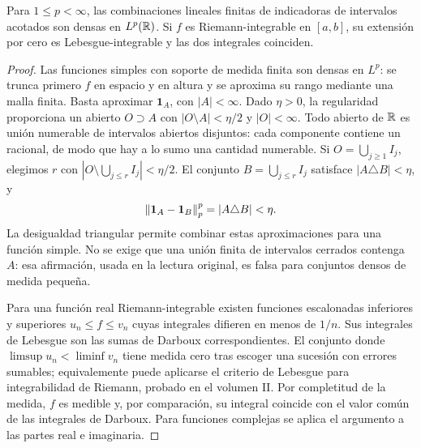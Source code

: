 \begin{teorema}\label{v4:densidad-escalonadas}
Para $1\leq p<\infty$, las combinaciones lineales finitas de indicadoras de intervalos acotados son densas en $L^p(\mathbb R)$. Si $f$ es Riemann-integrable en $[a,b]$, su extensión por cero es Lebesgue-integrable y las dos integrales coinciden.
\end{teorema}
\begin{proof}
Las funciones simples con soporte de medida finita son densas en $L^p$: se trunca primero $f$ en espacio y en altura y se aproxima su rango mediante una malla finita. Basta aproximar $\mathbf1_A$, con $|A|<\infty$. Dado $\eta>0$, la regularidad proporciona un abierto $O\supset A$ con $|O\setminus A|<\eta/2$ y $|O|<\infty$. Todo abierto de $\mathbb R$ es unión numerable de intervalos abiertos disjuntos: cada componente contiene un racional, de modo que hay a lo sumo una cantidad numerable. Si $O=\bigcup_{j\geq1}I_j$, elegimos $r$ con $|O\setminus\bigcup_{j\leq r}I_j|<\eta/2$. El conjunto $B=\bigcup_{j\leq r}I_j$ satisface $|A\triangle B|<\eta$, y
\[
 \left\lVert\mathbf1_A-\mathbf1_B\right\rVert_p^p=|A\triangle B|<\eta.
\]
La desigualdad triangular permite combinar estas aproximaciones para una función simple. No se exige que una unión finita de intervalos cerrados contenga $A$: esa afirmación, usada en la lectura original, es falsa para conjuntos densos de medida pequeña.

Para una función real Riemann-integrable existen funciones escalonadas inferiores y superiores $u_n\leq f\leq v_n$ cuyas integrales difieren en menos de $1/n$. Sus integrales de Lebesgue son las sumas de Darboux correspondientes. El conjunto donde $\limsup u_n<\liminf v_n$ tiene medida cero tras escoger una sucesión con errores sumables; equivalemente puede aplicarse el criterio de Lebesgue para integrabilidad de Riemann, probado en el volumen II. Por completitud de la medida, $f$ es medible y, por comparación, su integral coincide con el valor común de las integrales de Darboux. Para funciones complejas se aplica el argumento a las partes real e imaginaria.
\end{proof}

